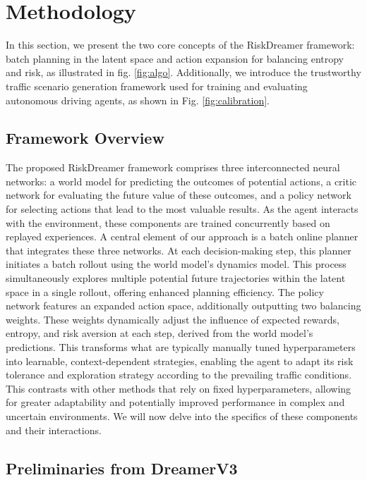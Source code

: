 

\section{Methodology}
\label{sec:method}
In this section, we present the two core concepts of the RiskDreamer framework: batch planning in the latent space and action expansion for balancing entropy and risk, as illustrated in fig. \ref{fig:algo}. Additionally, we introduce the trustworthy traffic scenario generation framework used for training and evaluating autonomous driving agents, as shown in Fig. \ref{fig:calibration}.

\subsection{Framework Overview}

The proposed RiskDreamer framework comprises three interconnected neural networks: a world model for predicting the outcomes of potential actions, a critic network for evaluating the future value of these outcomes, and a policy network for selecting actions that lead to the most valuable results. As the agent interacts with the environment, these components are trained concurrently based on replayed experiences. A central element of our approach is a batch online planner that integrates these three networks. At each decision-making step, this planner initiates a batch rollout using the world model's dynamics model. This process simultaneously explores multiple potential future trajectories within the latent space in a single rollout, offering enhanced planning efficiency. The policy network features an expanded action space, additionally outputting two balancing weights. These weights dynamically adjust the influence of expected rewards, entropy, and risk aversion at each step, derived from the world model's predictions. This transforms what are typically manually tuned hyperparameters into learnable, context-dependent strategies, enabling the agent to adapt its risk tolerance and exploration strategy according to the prevailing traffic conditions. This contrasts with other methods that rely on fixed hyperparameters, allowing for greater adaptability and potentially improved performance in complex and uncertain environments. We will now delve into the specifics of these components and their interactions.

\subsection{Preliminaries from DreamerV3}

